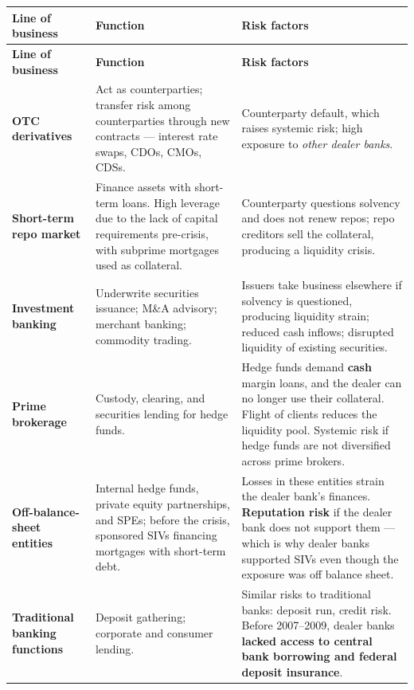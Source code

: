\begin{center}
\scriptsize
\begin{longtable}{@{}p{2.9cm} p{5.4cm} p{5.2cm}@{}}
\toprule
\rowcolor{FRMSoft}\textbf{Line of business} & \textbf{Function} & \textbf{Risk factors} \\
\midrule
\endfirsthead
\toprule
\rowcolor{FRMSoft}\textbf{Line of business} & \textbf{Function} & \textbf{Risk factors} \\
\midrule
\endhead
\textbf{OTC derivatives} &
Act as counterparties; transfer risk among counterparties through new contracts --- interest rate swaps, CDOs, CMOs, CDSs. &
Counterparty default, which raises systemic risk; high exposure to \emph{other dealer banks}. \\
\addlinespace
\textbf{Short-term repo market} &
Finance assets with short-term loans. High leverage due to the lack of capital requirements pre-crisis, with subprime mortgages used as collateral. &
Counterparty questions solvency and does not renew repos; repo creditors sell the collateral, producing a liquidity crisis. \\
\addlinespace
\textbf{Investment banking} &
Underwrite securities issuance; M\&A advisory; merchant banking; commodity trading. &
Issuers take business elsewhere if solvency is questioned, producing liquidity strain; reduced cash inflows; disrupted liquidity of existing securities. \\
\addlinespace
\textbf{Prime brokerage} &
Custody, clearing, and securities lending for hedge funds. &
Hedge funds demand \textbf{cash} margin loans, and the dealer can no longer use their collateral. Flight of clients reduces the liquidity pool. Systemic risk if hedge funds are not diversified across prime brokers. \\
\addlinespace
\textbf{Off-balance-sheet entities} &
Internal hedge funds, private equity partnerships, and SPEs; before the crisis, sponsored SIVs financing mortgages with short-term debt. &
Losses in these entities strain the dealer bank's finances. \textbf{Reputation risk} if the dealer bank does not support them --- which is why dealer banks supported SIVs even though the exposure was off balance sheet. \\
\addlinespace
\textbf{Traditional banking functions} &
Deposit gathering; corporate and consumer lending. &
Similar risks to traditional banks: deposit run, credit risk. Before 2007--2009, dealer banks \textbf{lacked access to central bank borrowing and federal deposit insurance}. \\
\bottomrule
\end{longtable}
\end{center}

